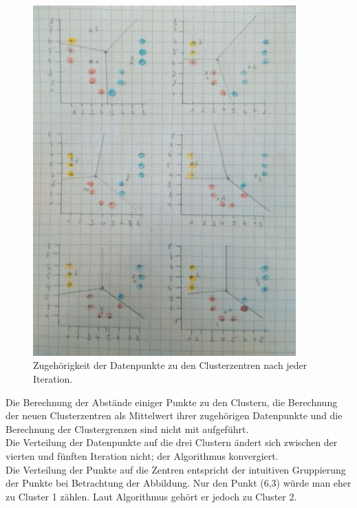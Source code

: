 \begin{figure}[H]
	\centering
	\includegraphics[width=0.9\textwidth]{kmeans.jpg}
	\caption{Zugehörigkeit der Datenpunkte zu den Clusterzentren nach jeder Iteration.}
\end{figure}



Die Berechnung der Abstände einiger Punkte zu den Clustern, die Berechnung der neuen Clusterzentren als Mittelwert ihrer zugehörigen Datenpunkte und die Berechnung der Clustergrenzen sind nicht mit aufgeführt. \\
Die Verteilung der Datenpunkte auf die drei Clustern ändert sich zwischen der vierten und fünften Iteration nicht; der Algorithmus konvergiert. \\
Die Verteilung der Punkte auf die Zentren entspricht der intuitiven Gruppierung der Punkte bei Betrachtung der Abbildung. Nur den Punkt (6,3) würde man eher zu Cluster 1 zählen. Laut Algorithmus gehört er jedoch zu Cluster 2.

